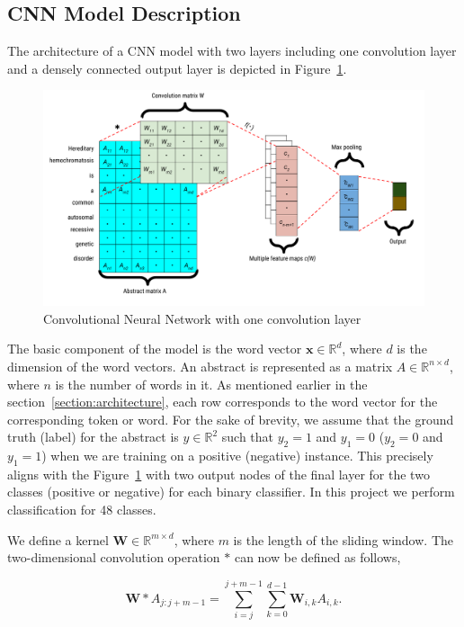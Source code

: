 \subsection{CNN Model Description}
The architecture of a CNN model with two layers including one convolution layer and a densely connected output layer is depicted in Figure~\ref{fig:Cnn_one_layer}.
\begin{figure}[!htb]
    \centering
    \includegraphics[scale=0.45]{Figures/cnn-model-example.png}
    \caption{Convolutional Neural Network with one convolution layer}
    \label{fig:Cnn_one_layer}
\end{figure}
The basic component of the model is the word vector $\mathbf{x} \in \mathbb{R}^d$, where $d$ is the dimension of the word vectors. An abstract is represented as a matrix $A \in \mathbb{R}^{n \times d}$, where $n$ is the number of words in it. As mentioned earlier in the section~\ref{section:architecture}, each row corresponds to the word vector for the corresponding token or word. For the sake of brevity, we assume that the ground truth (label) for the abstract is $y \in \mathbb{R}^2$ such that $y_2 = 1$ and $y_1 = 0$ ($y_2 = 0$ and $y_1 = 1$) when we are training on a positive (negative) instance. This precisely aligns with the Figure~\ref{fig:Cnn_one_layer} with two output nodes of the final layer for the two classes (positive or negative) for each binary classifier. In this project we perform classification for 48 classes. 

We define a kernel $\mathbf{W} \in \mathbb{R}^{m \times d}$, where $m$ is the length of the sliding window. The two-dimensional convolution operation $\mathbf{*}$ can now be defined as follows,

\begin{center}
\[\mathbf{W} * A_{j:j+m-1} = \sum_{i=j}^{j+m-1} \sum_{k=0}^{d-1} \mathbf{W}_{i,k} A_{i,k}.
\]
\end{center}

